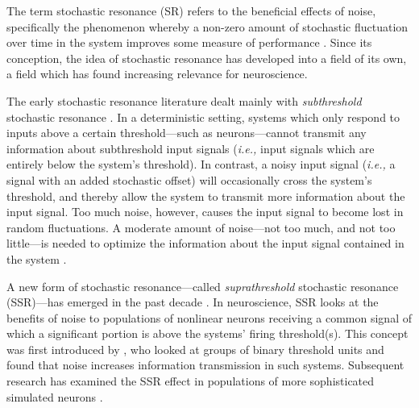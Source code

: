 \documentclass[letterpaper,11pt]{article}
\begin{document}
The term stochastic resonance (SR) refers to the beneficial effects of noise, specifically the phenomenon whereby a non-zero amount of stochastic fluctuation over time in the system improves some measure of performance \citep{McDonnell2009}. Since its conception, the idea of stochastic resonance has developed into a field of its own, a field which has found increasing relevance for neuroscience.

The early stochastic resonance literature dealt mainly with \emph{subthreshold} stochastic resonance \citep{Gammaitoni1998}. In a deterministic setting, systems which only respond to inputs above a certain threshold---such as neurons---cannot transmit any information about subthreshold input signals (\emph{i.e.,} input signals which are entirely below the system's threshold). In contrast, a noisy input signal (\emph{i.e.,} a signal with an added stochastic offset) will occasionally cross the system's threshold, and thereby allow the system to transmit more information about the input signal. Too much noise, however, causes the input signal to become lost in random fluctuations. A moderate amount of noise---not too much, and not too little---is needed to optimize the information about the input signal contained in the system \citep{Wiesenfeld1994,Longtin1998}.

A new form of stochastic resonance---called \emph{suprathreshold} stochastic resonance (SSR)---has emerged in the past decade \citep{McDonnell2009,McDonnell2011}. In neuroscience, SSR looks at the benefits of noise to populations of nonlinear neurons receiving a common signal of which a significant portion is above the systems' firing threshold(s). This concept was first introduced by \cite{Stocks2000}, who looked at groups of binary threshold units and found that noise increases information transmission in such systems. Subsequent research has examined the SSR effect in populations of more sophisticated simulated neurons \citep{Stocks2001}.
\end{document}
